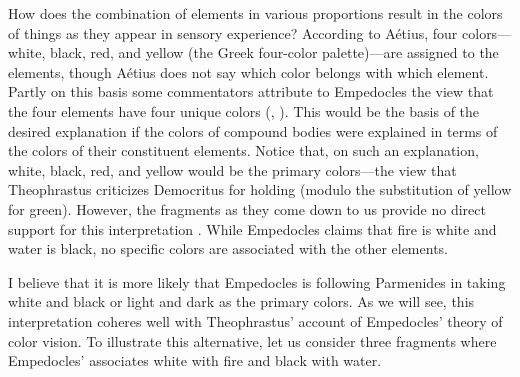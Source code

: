 How does the combination of elements in various proportions result in the colors of things as they appear in sensory experience? According to A\'{e}tius, four colors---white, black, red, and yellow (the Greek four-color palette)---are assigned to the elements, though A\'{e}tius does not say which color belongs with which element. Partly on this basis some commentators attribute to Empedocles the view that the four elements have four unique colors (\citealt[217]{Cherniss:1935fk}, \citealt[152-3]{Siegel:1959fk}). This would be the basis of the desired explanation if the colors of compound bodies were explained in terms of the colors of their constituent elements. Notice that, on such an explanation, white, black, red, and yellow would be the primary colors---the view that Theophrastus criticizes Democritus for holding (modulo the substitution of yellow for green).  However, the fragments as they come down to us provide no direct support for this interpretation \citep[see][]{Ierodiakonou:2005fk}. While Empedocles claims that fire is white and water is black, no specific colors are associated with the other elements. 

I believe that it is more likely that Empedocles is following Parmenides in taking white and black or light and dark as the primary colors. As we will see, this interpretation coheres well with Theophrastus' account of Empedocles' theory of color vision. To illustrate this alternative, let us consider three fragments where Empedocles' associates white with fire and black with water.


